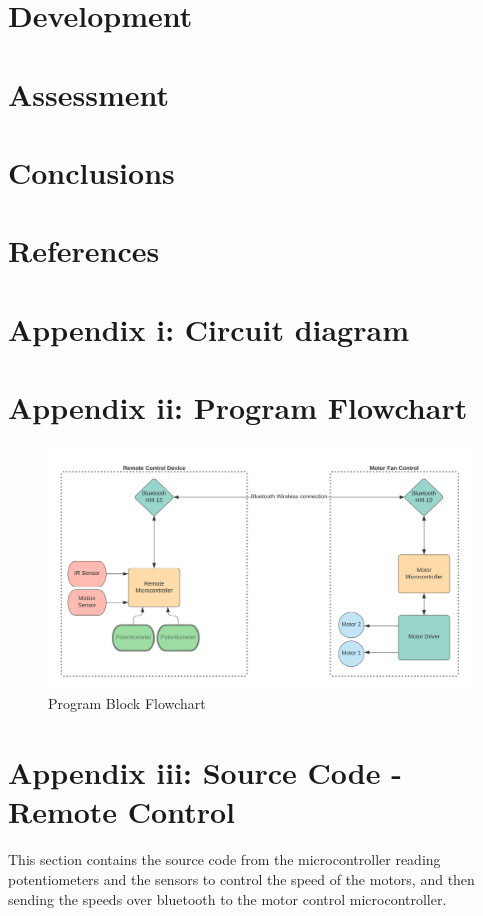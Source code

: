 \documentclass[a4paper,12pt]{article} %
\begin{document}
\section{Development}


\section{Assessment}


\section{Conclusions}


\section{References}


\section{Appendix i: Circuit diagram} %

\section{Appendix ii: Program Flowchart}

\begin{figure}[h]
\centering
  \includegraphics[width=1.0\textwidth]{Flow_chart.png}
   \caption{Program Block Flowchart}
 \end{figure}


\clearpage
\section{Appendix iii: Source Code - Remote Control} %
This section contains the source code from the microcontroller reading potentiometers and the sensors to control the speed of the motors, and then sending the speeds over bluetooth to the motor control microcontroller.
\vspace{5mm}
\linespread{1}

\linespread{1.6}
\vspace{5mm}
\end{document}
